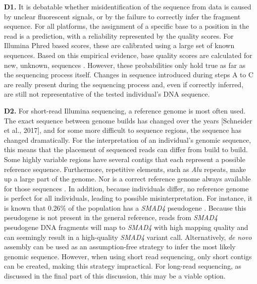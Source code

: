 \textbf{D1.} It is debatable whether misidentification of the sequence from data is caused by unclear fluorescent signals, or by the failure to correctly infer the fragment sequence. 
For all platforms, the assignment of a specific base to a position in the read is a prediction, with a reliability represented by the quality scores. 
For Illumina Phred based scores, these are calibrated using a large set of known sequences. 
Based on this empirical evidence, base quality scores are calculated for new, unknown, sequences \cite{Illumina_2011}.  
However, these probabilities only hold true as far as the sequencing process itself. 
Changes in sequence introduced during steps A to C are really present during the sequencing process and, even if correctly inferred, are still not representative of the tested individual’s DNA sequence. 


\textbf{D2.} For short-read Illumina sequencing, a reference genome is most often used. 
The exact sequence between genome builds has changed over the years [Schneider et al., 2017], and for some more difficult to sequence regions, the sequence has changed dramatically. 
For the interpretation of an individual’s genomic sequence, this means that the placement of sequenced reads can differ from build to build. 
Some highly variable regions have several contigs that each represent a possible reference sequence. 
Furthermore, repetitive elements, such as \textsl{Alu} repeats, make up a large part of the genome. 
Nor is a correct reference genome always available for those sequences \cite{Wildschutte_2015}. 
In addition, because individuals differ, no reference genome is perfect for all individuals, leading to possible misinterpretation. 
For instance, it is known that 0.26\% of the population has a \textsl{SMAD4} pseudogene \cite{Millson_2015}. 
Because this pseudogene is not present in the general reference, reads from \textsl{SMAD4} pseudogene DNA fragments will map to \textsl{SMAD4} with high mapping quality and can seemingly result in a high-quality \textsl{SMAD4} variant call. 
Alternatively, \textsl{de novo} assembly can be used as an assumption-free strategy to infer the most likely genomic sequence. 
However, when using short read sequencing, only short contigs can be created, making this strategy impractical. 
For long-read sequencing, as discussed in the final part of this discussion, this may be a viable option.

